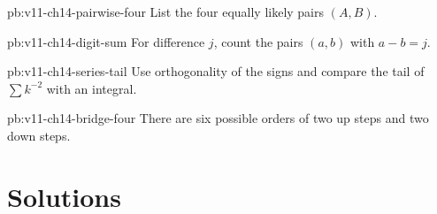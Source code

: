 \begin{hint}{pb:v11-ch14-pairwise-four}
List the four equally likely pairs $(A,B)$.
\end{hint}

\begin{hint}{pb:v11-ch14-digit-sum}
For difference $j$, count the pairs $(a,b)$ with $a-b=j$.
\end{hint}

\begin{hint}{pb:v11-ch14-series-tail}
Use orthogonality of the signs and compare the tail of $\sum k^{-2}$ with an integral.
\end{hint}

\begin{hint}{pb:v11-ch14-bridge-four}
There are six possible orders of two up steps and two down steps.
\end{hint}

\section*{Solutions}

